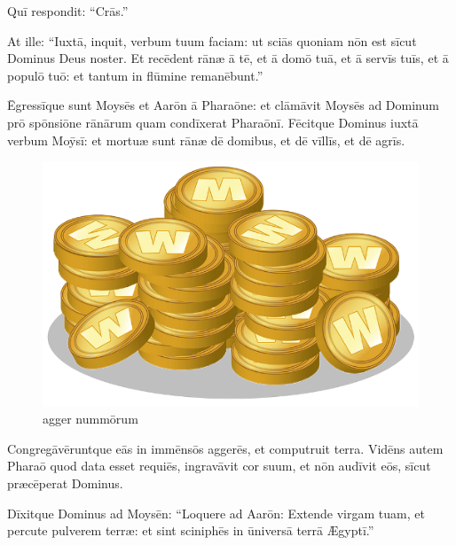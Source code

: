 Quī respondit: ``Crās.''

At ille: ``Iuxtā, inquit, verbum tuum faciam: ut sciās
quoniam nōn est sīcut Dominus Deus noster.  Et recēdent
rānæ ā tē, et ā domō tuā, et ā servīs tuīs, et ā populō tuō:
et tantum in flūmine remanēbunt.''

Ēgressīque sunt
Moysēs et Aarōn ā Pharaōne: et clāmāvit
Moysēs ad Dominum prō spōnsiōne
rānārum quam condīxerat
Pharaōnī.  Fēcitque Dominus iuxtā verbum Moȳsī: et
mortuæ sunt rānæ dē domibus, et dē vīllīs, et dē agrīs.

\begin{figure}[h]
    \begin{minipage}[h!]{1\linewidth}
        \centering
        \includegraphics{agger.png}
        \caption{agger nummōrum}
    \end{minipage}%
\end{figure}

Congregāvēruntque eās in immēnsōs
aggerēs, et computruit terra.  Vidēns autem
Pharaō quod data esset requiēs, ingravāvit cor suum, et nōn
audīvit eōs, sīcut præcēperat Dominus. 

Dīxitque Dominus ad Moysēn: ``Loquere ad Aarōn: Extende
virgam tuam, et percute pulverem terræ: et sint
 sciniphēs in ūniversā terrā Ægyptī.''

